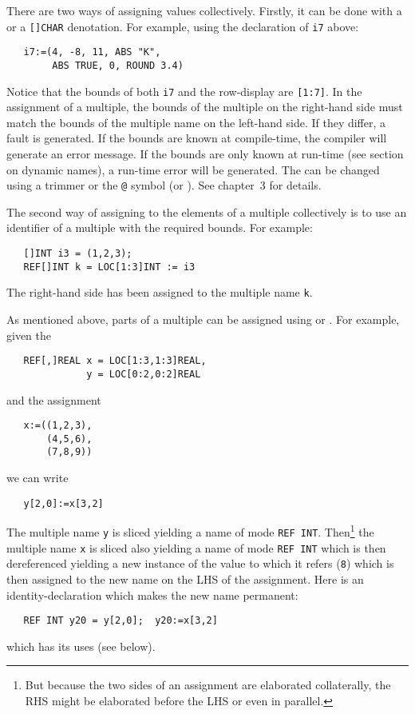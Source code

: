 There are two ways of assigning values collectively.  Firstly, it can
be done with a  or a \verb|[]CHAR|
denotation. For example, using the declaration of \verb|i7| above:
\begin{verbatim}
   i7:=(4, -8, 11, ABS "K",
        ABS TRUE, 0, ROUND 3.4)
\end{verbatim}
\noindent
Notice that the bounds of both \verb|i7| and the row-display are
\verb|[1:7]|. In the assignment of a multiple, the bounds of the
multiple on the right-hand side must match the bounds of the multiple
name on the left-hand side. If they differ, a fault is generated. If
the bounds are known at compile-time, the compiler will generate an
error message. If the bounds are only known at run-time (see section
 on dynamic names), a run-time error will be
generated. The  can be changed using a trimmer or the
\verb|@| symbol (or ). See chapter~3 for details.

The second way of assigning to the elements of a multiple collectively
is to use an identifier of a multiple with the required bounds. For
example:
\begin{verbatim}
   []INT i3 = (1,2,3);
   REF[]INT k = LOC[1:3]INT := i3
\end{verbatim}
\noindent
The right-hand side has been assigned to the multiple name \verb|k|.

As mentioned above, parts of a multiple can be assigned using
 or . For example, given the
\begin{verbatim}
   REF[,]REAL x = LOC[1:3,1:3]REAL,
              y = LOC[0:2,0:2]REAL
\end{verbatim}
\noindent
and the assignment
\begin{verbatim}
   x:=((1,2,3),
       (4,5,6),
       (7,8,9))
\end{verbatim}
\noindent
we can write
\begin{verbatim}
   y[2,0]:=x[3,2]
\end{verbatim}
\noindent
The multiple name \verb|y| is sliced yielding a name of mode
\verb|REF INT|. Then\footnote{But because the two sides of an
assignment are elaborated collaterally, the RHS might be elaborated
before the LHS or even in parallel.} the multiple name \verb|x| is
sliced also yielding a name of mode \verb|REF INT| which is then
dereferenced yielding a new instance of the value to which it refers
(\verb|8|) which is then assigned to the new name on the LHS of the
assignment.  Here is an identity-declaration which makes the new name
permanent:
\begin{verbatim}
   REF INT y20 = y[2,0];  y20:=x[3,2]
\end{verbatim}
\noindent
which has its uses (see below).

